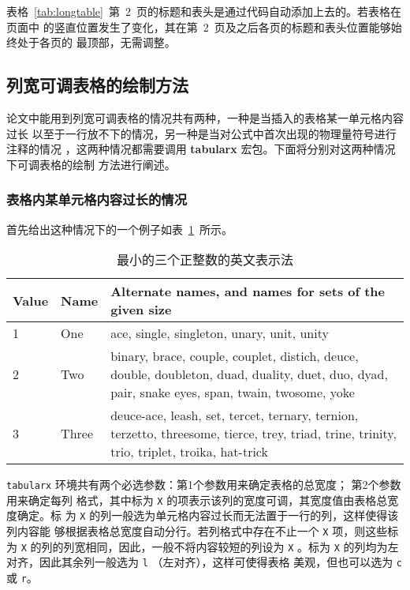 表格~\ref{tab:longtable}~第~2~页的标题和表头是通过代码自动添加上去的。若表格在页面中
的竖直位置发生了变化，其在第~2~页及之后各页的标题和表头位置能够始终处于各页的
最顶部，无需调整。

\subsection{列宽可调表格的绘制方法}

论文中能用到列宽可调表格的情况共有两种，一种是当插入的表格某一单元格内容过长
以至于一行放不下的情况，另一种是当对公式中首次出现的物理量符号进行注释的情况
，这两种情况都需要调用 \textbf{tabularx} 宏包。下面将分别对这两种情况下可调表格的绘制
方法进行阐述。

\subsubsection{表格内某单元格内容过长的情况}

首先给出这种情况下的一个例子如表~\ref{tab:tabularx}~所示。

\begin{table}[htbp]
\caption{最小的三个正整数的英文表示法}
\label{tab:tabularx}
\begin{tabularx}{\textwidth}{llX}
\toprule
Value & Name & Alternate names, and names for sets of the given size\\
\midrule
1 & One & ace, single, singleton, unary, unit, unity\\
2 & Two & binary, brace, couple, couplet, distich, deuce, double, doubleton, duad, duality, duet, duo, dyad, pair, snake eyes, span, twain, twosome, yoke\\
3 & Three & deuce-ace, leash, set, tercet, ternary, ternion, terzetto, threesome, tierce, trey, triad, trine, trinity, trio, triplet, troika, hat-trick\\\bottomrule
\end{tabularx}
\end{table}

\texttt{tabularx} 环境共有两个必选参数：第1个参数用来确定表格的总宽度；
第2个参数用来确定每列
格式，其中标为 \texttt{X} 的项表示该列的宽度可调，其宽度值由表格总宽度确定。标
为 \texttt{X} 的列一般选为单元格内容过长而无法置于一行的列，这样使得该列内容能
够根据表格总宽度自动分行。若列格式中存在不止一个 \texttt{X} 项，则这些标为
\texttt{X} 的列的列宽相同，因此，一般不将内容较短的列设为 \texttt{X} 。标为
\texttt{X} 的列均为左对齐，因此其余列一般选为 \texttt{l} （左对齐），这样可使得表格
美观，但也可以选为 \texttt{c} 或 \texttt{r}。

